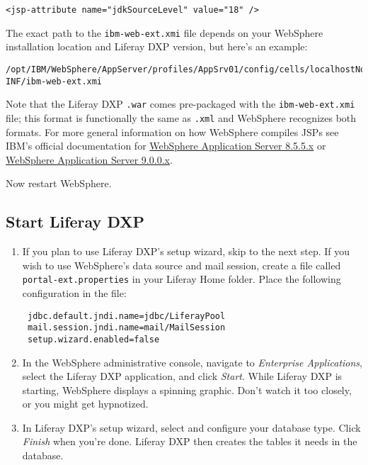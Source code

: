 \begin{verbatim}
<jsp-attribute name="jdkSourceLevel" value="18" />
\end{verbatim}

The exact path to the \texttt{ibm-web-ext.xmi} file depends on your
WebSphere installation location and Liferay DXP version, but here's an
example:

\begin{verbatim}
/opt/IBM/WebSphere/AppServer/profiles/AppSrv01/config/cells/localhostNode01Cell/applications/liferayXX.ear/deployments/liferayXX/liferayXX.war/WEB-INF/ibm-web-ext.xmi
\end{verbatim}

Note that the Liferay DXP \texttt{.war} comes pre-packaged with the
\texttt{ibm-web-ext.xmi} file; this format is functionally the same as
\texttt{.xml} and WebSphere recognizes both formats. For more general
information on how WebSphere compiles JSPs see IBM's official
documentation for
\href{https://www.ibm.com/support/knowledgecenter/en/SSAW57_8.5.5/com.ibm.websphere.nd.doc/ae/rweb_jspengine.html}{WebSphere
Application Server 8.5.5.x} or
\href{https://www.ibm.com/support/knowledgecenter/en/SSEQTP_9.0.0/com.ibm.websphere.base.doc/ae/rweb_jspengine.html}{WebSphere
Application Server 9.0.0.x}.

Now restart WebSphere.

\subsection{Start Liferay DXP}\label{start-liferay-dxp}

\begin{enumerate}
\def\labelenumi{\arabic{enumi}.}
\item
  If you plan to use Liferay DXP's setup wizard, skip to the next step.
  If you wish to use WebSphere's data source and mail session, create a
  file called \texttt{portal-ext.properties} in your Liferay Home
  folder. Place the following configuration in the file:

\begin{verbatim}
 jdbc.default.jndi.name=jdbc/LiferayPool
 mail.session.jndi.name=mail/MailSession
 setup.wizard.enabled=false
\end{verbatim}
\item
  In the WebSphere administrative console, navigate to \emph{Enterprise
  Applications}, select the Liferay DXP application, and click
  \emph{Start}. While Liferay DXP is starting, WebSphere displays a
  spinning graphic. Don't watch it too closely, or you might get
  hypnotized.
\item
  In Liferay DXP's setup wizard, select and configure your database
  type. Click \emph{Finish} when you're done. Liferay DXP then creates
  the tables it needs in the database.
\end{enumerate}

